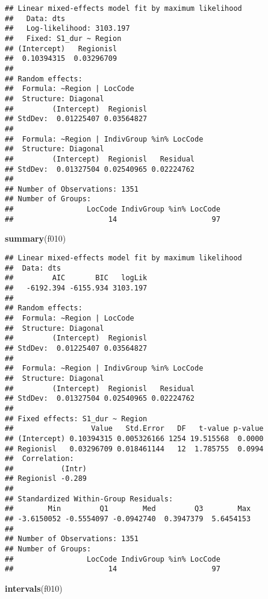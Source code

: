 \documentclass[]{article}
\newenvironment{Shaded}{\begin{snugshade}}{\end{snugshade}}
\newcommand{\KeywordTok}[1]{\textcolor[rgb]{0.13,0.29,0.53}{\textbf{#1}}}
\newcommand{\NormalTok}[1]{#1}
\begin{document}
\begin{verbatim}
## Linear mixed-effects model fit by maximum likelihood
##   Data: dts 
##   Log-likelihood: 3103.197
##   Fixed: S1_dur ~ Region 
## (Intercept)   Regionisl 
##  0.10394315  0.03296709 
## 
## Random effects:
##  Formula: ~Region | LocCode
##  Structure: Diagonal
##         (Intercept)  Regionisl
## StdDev:  0.01225407 0.03564827
## 
##  Formula: ~Region | IndivGroup %in% LocCode
##  Structure: Diagonal
##         (Intercept)  Regionisl   Residual
## StdDev:  0.01327504 0.02540965 0.02224762
## 
## Number of Observations: 1351
## Number of Groups: 
##                 LocCode IndivGroup %in% LocCode 
##                      14                      97
\end{verbatim}

\begin{Shaded}
\begin{Highlighting}[]
\KeywordTok{summary}\NormalTok{(f010)}
\end{Highlighting}
\end{Shaded}

\begin{verbatim}
## Linear mixed-effects model fit by maximum likelihood
##  Data: dts 
##         AIC       BIC   logLik
##   -6192.394 -6155.934 3103.197
## 
## Random effects:
##  Formula: ~Region | LocCode
##  Structure: Diagonal
##         (Intercept)  Regionisl
## StdDev:  0.01225407 0.03564827
## 
##  Formula: ~Region | IndivGroup %in% LocCode
##  Structure: Diagonal
##         (Intercept)  Regionisl   Residual
## StdDev:  0.01327504 0.02540965 0.02224762
## 
## Fixed effects: S1_dur ~ Region 
##                  Value   Std.Error   DF   t-value p-value
## (Intercept) 0.10394315 0.005326166 1254 19.515568  0.0000
## Regionisl   0.03296709 0.018461144   12  1.785755  0.0994
##  Correlation: 
##           (Intr)
## Regionisl -0.289
## 
## Standardized Within-Group Residuals:
##        Min         Q1        Med         Q3        Max 
## -3.6150052 -0.5554097 -0.0942740  0.3947379  5.6454153 
## 
## Number of Observations: 1351
## Number of Groups: 
##                 LocCode IndivGroup %in% LocCode 
##                      14                      97
\end{verbatim}

\begin{Shaded}
\begin{Highlighting}[]
\KeywordTok{intervals}\NormalTok{(f010)}
\end{Highlighting}
\end{Shaded}
\end{document}

